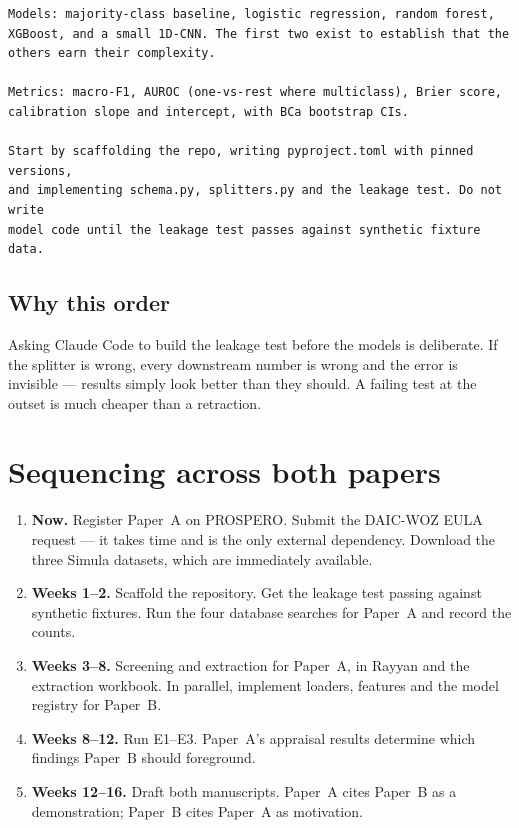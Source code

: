\documentclass[11pt,a4paper]{article}
\begin{document}
\begin{lstlisting}
Models: majority-class baseline, logistic regression, random forest,
XGBoost, and a small 1D-CNN. The first two exist to establish that the
others earn their complexity.

Metrics: macro-F1, AUROC (one-vs-rest where multiclass), Brier score,
calibration slope and intercept, with BCa bootstrap CIs.

Start by scaffolding the repo, writing pyproject.toml with pinned versions,
and implementing schema.py, splitters.py and the leakage test. Do not write
model code until the leakage test passes against synthetic fixture data.
\end{lstlisting}

\subsection{Why this order}

Asking Claude Code to build the leakage test before the models is
deliberate. If the splitter is wrong, every downstream number is wrong and
the error is invisible --- results simply look better than they should. A
failing test at the outset is much cheaper than a retraction.

\section{Sequencing across both papers}

\begin{enumerate}
  \item \textbf{Now.} Register Paper~A on PROSPERO. Submit the DAIC-WOZ
        EULA request --- it takes time and is the only external dependency.
        Download the three Simula datasets, which are immediately available.
  \item \textbf{Weeks 1--2.} Scaffold the repository. Get the leakage test
        passing against synthetic fixtures. Run the four database searches
        for Paper~A and record the counts.
  \item \textbf{Weeks 3--8.} Screening and extraction for Paper~A, in Rayyan
        and the extraction workbook. In parallel, implement loaders,
        features and the model registry for Paper~B.
  \item \textbf{Weeks 8--12.} Run E1--E3. Paper~A's appraisal results
        determine which findings Paper~B should foreground.
  \item \textbf{Weeks 12--16.} Draft both manuscripts. Paper~A cites Paper~B
        as a demonstration; Paper~B cites Paper~A as motivation.
\end{enumerate}
\end{document}
